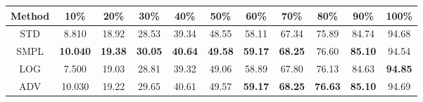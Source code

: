 \documentclass{standalone}
\begin{document}
\begin{tabular}{c|cccccccccc}
      \toprule
      Method & 10\% & 20\% & 30\% & 40\% & 50\% & 60\% & 70\% & 80\% & 90\% & 100\% \\
      \midrule
STD & 8.810 & 18.92 & 28.53 & 39.34 & 48.55 & 58.11 & 67.34 & 75.89 & 84.74 & 94.68\\
SMPL & \textbf{10.040} & \textbf{19.38} & \textbf{30.05} & \textbf{40.64} & \textbf{49.58} & \textbf{59.17} & \textbf{68.25} & 76.60 & \textbf{85.10} & 94.54\\
LOG & 7.500 & 19.03 & 28.81 & 39.32 & 49.06 & 58.89 & 67.80 & 76.13 & 84.63 & \textbf{94.85}\\
ADV & 10.030 & 19.22 & 29.65 & 40.61 & 49.57 & \textbf{59.17} & \textbf{68.25} & \textbf{76.63} & \textbf{85.10} & 94.69\\
  \bottomrule
\end{tabular}
\end{document}
